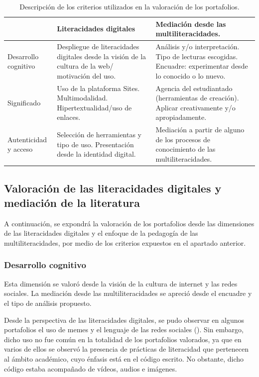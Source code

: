 \begin{table}[!htpb]
\centering
\begin{threeparttable}
\caption{Descripción de los criterios utilizados en la valoración de los portafolios.}
\label{tab-03}
\begin{tabular}{lp{5cm}p{5cm}}
\toprule
	& Literacidades digitales & Mediación desde las multiliteracidades. \\
\midrule
Desarrollo cognitivo & Despliegue de literacidades digitales desde la visión de la cultura de la web/ motivación del uso. & Análisis y/o interpretación. Tipo de lecturas escogidas. Encuadre: experimentar desde lo conocido o lo nuevo. \\
Significado & Uso de la plataforma Sites. Multimodalidad. Hipertextualidad/uso de enlaces. & Agencia del estudiantado (herramientas de creación). Aplicar creativamente y/o apropiadamente. \\
Autenticidad y acceso & Selección de herramientas y tipo de uso. Presentación desde la identidad digital. & Mediación a partir de alguno de los procesos de conocimiento de las multiliteracidades. \\
\bottomrule	
\end{tabular}
\end{threeparttable}
\end{table}

\subsection{Valoración de las literacidades digitales y mediación de la literatura}\label{sub-sec-valoracióndelas}
	A continuación, se expondrá la valoración de los portafolios desde las
	dimensiones de las literacidades digitales y el enfoque de la pedagogía
	de las multiliteracidades, por medio de los criterios expuestos en el
	apartado anterior.

\subsubsection{Desarrollo cognitivo}\label{sub-sub-sub-sec-desarrollo}

Esta dimensión se valoró desde la visión de la cultura de internet y las
redes sociales. La mediación desde las multiliteracidades se apreció
desde el encuadre y el tipo de análisis propuesto.

Desde la perspectiva de las literacidades digitales, se pudo observar en
algunos portafolios el uso de memes y el lenguaje de las redes sociales
(). Sin embargo, dicho uso no fue común en la totalidad de los
portafolios valorados, ya que en varios de ellos se observó la presencia
de prácticas de literacidad que pertenecen al ámbito académico, cuyo
énfasis está en el código escrito. No obstante, dicho código estaba
acompañado de vídeos, audios e imágenes.

